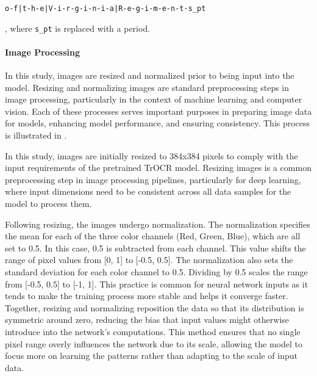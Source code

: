 \begin{center}
    \texttt{o-f|t-h-e|V-i-r-g-i-n-i-a|R-e-g-i-m-e-n-t-s\_pt} 
\end{center}

, where \texttt{s\_pt} is replaced with a period.

\paragraph*{Image Processing}
\label{par:3_image_processing}
In this study, images are resized and normalized prior to being input into the model. Resizing and normalizing images are standard preprocessing steps in image processing, particularly in the context of machine learning and computer vision. Each of these processes serves important purposes in preparing image data for models, enhancing model performance, and ensuring consistency. This process is illustrated in .

In this study, images are initially resized to 384x384 pixels to comply with the input requirements of the pretrained TrOCR model. Resizing images is a common preprocessing step in image processing pipelines, particularly for deep learning, where input dimensions need to be consistent across all data samples for the model to process them.

Following resizing, the images undergo normalization. The normalization specifies the mean for each of the three color channels (Red, Green, Blue), which are all set to 0.5. In this case, 0.5 is subtracted from each channel. This value shifts the range of pixel values from [0, 1] to [-0.5, 0.5]. The normalization also sets the standard deviation for each color channel to 0.5. Dividing by 0.5 scales the range from [-0.5, 0.5] to [-1, 1]. This practice is common for neural network inputs as it tends to make the training process more stable and helps it converge faster. Together, resizing and normalizing reposition the data so that its distribution is symmetric around zero, reducing the bias that input values might otherwise introduce into the network's computations. This method ensures that no single pixel range overly influences the network due to its scale, allowing the model to focus more on learning the patterns rather than adapting to the scale of input data.


